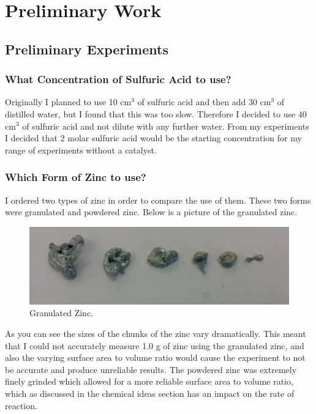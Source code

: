 \chapter {Preliminary Work} 

\section {Preliminary Experiments}

	\subsection {What Concentration of Sulfuric Acid to use?}

Originally I planned to use 10 cm$^3$ of sulfuric acid and then add 30 cm$^3$ of distilled water, but I found that this was too slow. Therefore I decided to use 40 cm$^3$ of sulfuric acid and not dilute with any further water. From my experiments I decided that 2 molar sulfuric acid would be the starting concentration for my range of experiments without a catalyst.









	\subsection{Which Form of Zinc to use?}

I ordered two types of zinc in order to compare the use of them. These two forms were granulated and powdered zinc. Below is a picture of the granulated zinc.

\begin{figure}[H]
    \includegraphics[width=\textwidth]{./preliminarywork/images/GranulatedZinc.jpg}
    \caption{Granulated Zinc.} \label{fig:Granulated Zinc}
\end{figure}

As you can see the sizes of the chunks of the zinc vary dramatically. This meant that I could not accurately measure 1.0 g of zinc using the granulated zinc, and also the varying surface area to volume ratio would cause the experiment to not be accurate and produce unreliable results. The powdered zinc was extremely finely grinded which allowed for a more reliable surface area to volume ratio, which as discussed in the chemical ideas section has an impact on the rate of reaction.



